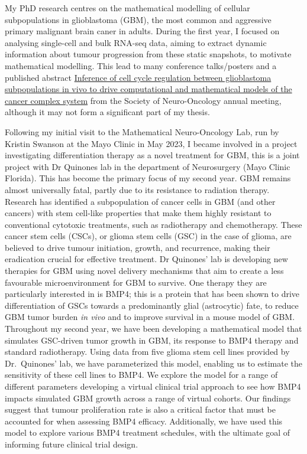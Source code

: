 \documentclass[
  letterpaper,
]{scrreprt}
\theoremstyle{definition}
\theoremstyle{remark}
\begin{document}
My PhD research centres on the mathematical modelling of cellular
subpopulations in glioblastoma (GBM), the most common and aggressive
primary malignant brain caner in adults. During the first year, I
focused on analysing single-cell and bulk RNA-seq data, aiming to
extract dynamic information about tumour progression from these static
snapshots, to motivate mathematical modelling. This lead to many
conference talks/posters and a published abstract
\href{https://doi.org/10.1093/neuonc/noad179.0150}{Inference of cell
cycle regulation between glioblastoma subpopulations in vivo to drive
computational and mathematical models of the cancer complex system} from
the Society of Neuro-Oncology annual meeting, although it may not form a
significant part of my thesis.

Following my initial visit to the Mathematical Neuro-Oncology Lab, run
by Kristin Swanson at the Mayo Clinic in May 2023, I became involved in
a project investigating differentiation therapy as a novel treatment for
GBM, this is a joint project with Dr Quinones lab in the department of
Neurosurgery (Mayo Clinic Florida). This has become the primary focus of
my second year. GBM remains almost universally fatal, partly due to its
resistance to radiation therapy. Research has identified a subpopulation
of cancer cells in GBM (and other cancers) with stem cell-like
properties that make them highly resistant to conventional cytotoxic
treatments, such as radiotherapy and chemotherapy. These cancer stem
cells (CSCs), or glioma stem cells (GSC) in the case of glioma, are
believed to drive tumour initiation, growth, and recurrence, making
their eradication crucial for effective treatment. Dr Quinones' lab is
developing new therapies for GBM using novel delivery mechanisms that
aim to create a less favourable microenvironment for GBM to survive. One
therapy they are particularly interested in is BMP4; this is a protein
that has been shown to drive differentiation of GSCs towards a
predominantly glial (astrocytic) fate, to reduce GBM tumor burden
\emph{in vivo} and to improve survival in a mouse model of GBM.
Throughout my second year, we have been developing a mathematical model
that simulates GSC-driven tumor growth in GBM, its response to BMP4
therapy and standard radiotherapy. Using data from five glioma stem cell
lines provided by Dr.~Quinones' lab, we have parameterized this model,
enabling us to estimate the sensitivity of these cell lines to BMP4. We
explore the model for a range of different parameters developing a
virtual clinical trial approach to see how BMP4 impacts simulated GBM
growth across a range of virtual cohorts. Our findings suggest that
tumour proliferation rate is also a critical factor that must be
accounted for when assessing BMP4 efficacy. Additionally, we have used
this model to explore various BMP4 treatment schedules, with the
ultimate goal of informing future clinical trial design.
\end{document}
